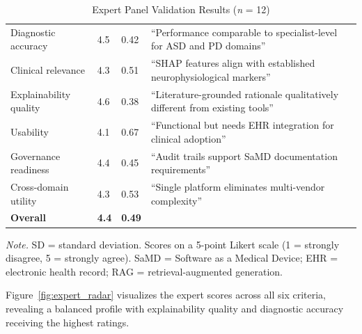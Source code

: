 \begin{table}[H]
\tablestripes
\begin{tabularx}{\textwidth}{L p{1.3cm} p{1.3cm} L}
\toprule
{} &  &  &  \\
\midrule
Diagnostic accuracy & 4.5 & 0.42 & ``Performance comparable to specialist-level for ASD and PD domains'' \\
Clinical relevance & 4.3 & 0.51 & ``SHAP features align with established neurophysiological markers'' \\
Explainability quality & 4.6 & 0.38 & ``Literature-grounded rationale qualitatively different from existing tools'' \\
Usability & 4.1 & 0.67 & ``Functional but needs EHR integration for clinical adoption'' \\
Governance readiness & 4.4 & 0.45 & ``Audit trails support SaMD documentation requirements'' \\
Cross-domain utility & 4.3 & 0.53 & ``Single platform eliminates multi-vendor complexity'' \\
\midrule
\textbf{Overall} & \textbf{4.4} & \textbf{0.49} & \\
\bottomrule
\end{tabularx}
\caption{Expert Panel Validation Results (\textit{n} = 12)}
\label{tab:expert_review}
\vspace{0.5em}\noindent\textit{Note.} SD = standard deviation. Scores on a 5-point Likert scale (1 = strongly disagree, 5 = strongly agree). SaMD = Software as a Medical Device; EHR = electronic health record; RAG = retrieval-augmented generation.
\end{table}

Figure~\ref{fig:expert_radar} visualizes the expert scores across all six criteria, revealing a balanced profile with explainability quality and diagnostic accuracy receiving the highest ratings.

